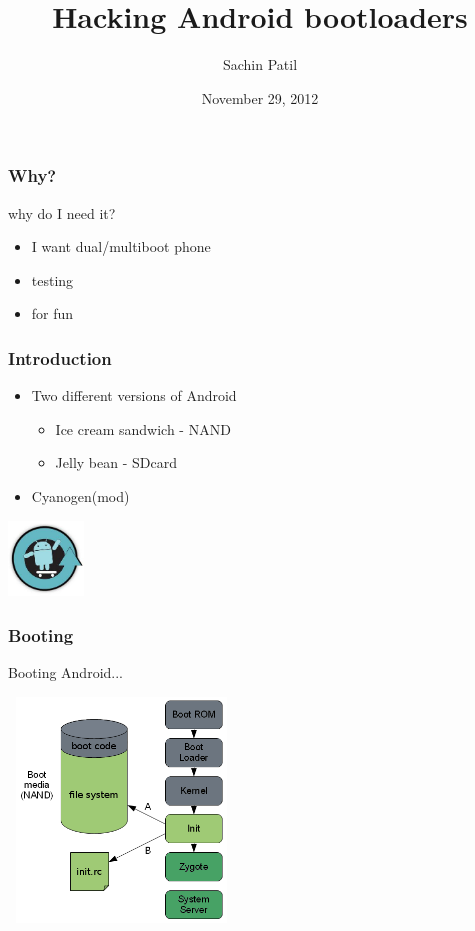 \documentclass{beamer}
\title[foss.in | Hacking Android bootloaders]{Hacking Android bootloaders}
\author{Sachin Patil}
\institute[IIT, Bombay]
{Indian Institute of Technology, Bombay \\
\medskip
isachin@iitb.ac.in
}
\date{November 29, 2012}
\begin{document}

\begin{frame}
\titlepage
\end{frame}
\begin{frame}
\frametitle{Why?}
\begin{block}                 
{why do I need it?}
\begin{itemize}
  \item I want dual/multiboot phone
  \item testing
  \item for fun
\end{itemize}
\end{block}
\end{frame}
\begin{frame}
\frametitle{Introduction}
\begin{block}                 
{}
\begin{itemize}
  \item Two different versions of Android
    \begin{itemize}
      \item Ice cream sandwich - NAND
      \item Jelly bean - SDcard
    \end{itemize}
  \item Cyanogen(mod)
\end{itemize}
\end{block}
\begin{center}
  \includegraphics[width=2cm, height=2cm]{cm.jpg}
\end{center}
\end{frame}
\begin{frame}
\frametitle{Booting}
{Booting Android...}
\begin{center} 
  \includegraphics[width=6cm,height=6cm]{booting.png} 
\end{center} 
\end{frame}
\end{document}
